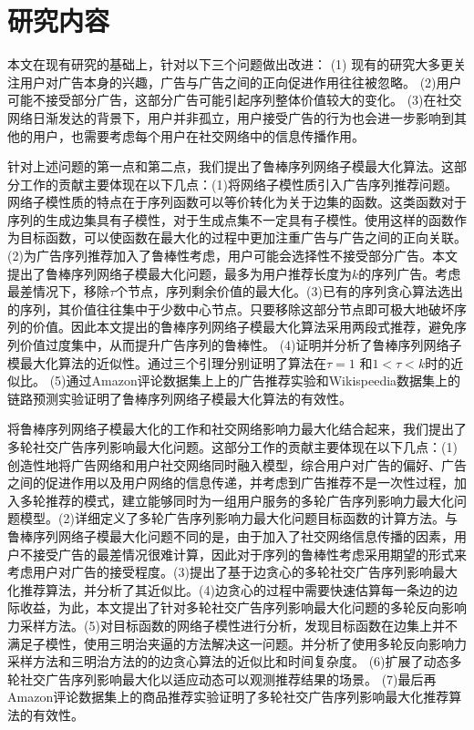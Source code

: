 \section{研究内容}

本文在现有研究的基础上，针对以下三个问题做出改进：
(1) 现有的研究大多更关注用户对广告本身的兴趣，广告与广告之间的正向促进作用往往被忽略。
(2)用户可能不接受部分广告，这部分广告可能引起序列整体价值较大的变化。
(3)在社交网络日渐发达的背景下，用户并非孤立，用户接受广告的行为也会进一步影响到其他的用户，也需要考虑每个用户在社交网络中的信息传播作用。

针对上述问题的第一点和第二点，我们提出了鲁棒序列网络子模最大化算法。这部分工作的贡献主要体现在以下几点：(1)将网络子模性质引入广告序列推荐问题。网络子模性质的特点在于序列函数可以等价转化为关于边集的函数。这类函数对于序列的生成边集具有子模性，对于生成点集不一定具有子模性。使用这样的函数作为目标函数，可以使函数在最大化的过程中更加注重广告与广告之间的正向关联。(2)为广告序列推荐加入了鲁棒性考虑，用户可能会选择性不接受部分广告。本文提出了鲁棒序列网络子模最大化问题，最多为用户推荐长度为$k$的序列广告。考虑最差情况下，移除$\tau$个节点，序列剩余价值的最大化。(3)已有的序列贪心算法\cite{tschiatschek2017selecting,mitrovic2018submodularity}选出的序列，其价值往往集中于少数中心节点。只要移除这部分节点即可极大地破坏序列的价值。因此本文提出的鲁棒序列网络子模最大化算法采用两段式推荐，避免序列价值过度集中，从而提升广告序列的鲁棒性。
(4)证明并分析了鲁棒序列网络子模最大化算法的近似性。通过三个引理分别证明了算法在$\tau = 1$ 和$1< \tau < k$时的近似比。
(5)通过Amazon评论数据集上\cite{ni2019justifying}上的广告推荐实验和Wikispeedia数据集\cite{west2009wikispeedia}上的链路预测实验证明了鲁棒序列网络子模最大化算法的有效性。

将鲁棒序列网络子模最大化的工作和社交网络影响力最大化结合起来，我们提出了多轮社交广告序列影响最大化问题。这部分工作的贡献主要体现在以下几点：(1)创造性地将广告网络和用户社交网络同时融入模型，综合用户对广告的偏好、广告之间的促进作用以及用户网络的信息传递，并考虑到广告推荐不是一次性过程，加入多轮推荐的模式，建立能够同时为一组用户服务的多轮广告序列影响力最大化问题模型。(2)详细定义了多轮广告序列影响力最大化问题目标函数的计算方法。与鲁棒序列网络子模最大化问题不同的是，由于加入了社交网络信息传播的因素，用户不接受广告的最差情况很难计算，因此对于序列的鲁棒性考虑采用期望的形式来考虑用户对广告的接受程度。(3)提出了基于边贪心的多轮社交广告序列影响最大化推荐算法，并分析了其近似比。(4)边贪心的过程中需要快速估算每一条边的边际收益，为此，本文提出了针对多轮社交广告序列影响最大化问题的多轮反向影响力采样方法。(5)对目标函数的网络子模性进行分析，发现目标函数在边集上并不满足子模性，使用三明治夹逼的方法解决这一问题。并分析了使用多轮反向影响力采样方法和三明治方法的的边贪心算法的近似比和时间复杂度。
(6)扩展了动态多轮社交广告序列影响最大化以适应动态可以观测推荐结果的场景。
(7)最后再Amazon评论数据集\cite{amazon24}上的商品推荐实验证明了多轮社交广告序列影响最大化推荐算法的有效性。

